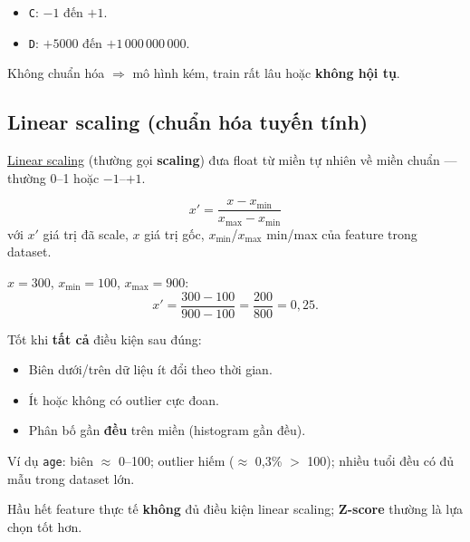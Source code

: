 \documentclass[12pt,a4paper]{article}
\begin{document}
\begin{vidu}[title={Feature miền chênh cực lớn}]
\begin{itemize}
  \item \texttt{C}: $-1$ đến $+1$.
  \item \texttt{D}: $+5000$ đến $+1\,000\,000\,000$.
\end{itemize}
Không chuẩn hóa $\Rightarrow$ mô hình kém, train rất lâu hoặc \textbf{không hội tụ}.
\end{vidu}

\subsection{Linear scaling (chuẩn hóa tuyến tính)}

\begin{dinhnghia}
\href{https://developers.google.com/machine-learning/glossary\#scaling}{Linear scaling} (thường gọi \textbf{scaling}) đưa float từ miền tự nhiên về miền chuẩn --- thường 0--1 hoặc $-1$--$+1$.
\end{dinhnghia}

\begin{congthuc}[title={Công thức scale về 0--1}]
\[
  x' = \frac{x - x_{\min}}{x_{\max} - x_{\min}}
\]
với $x'$ giá trị đã scale, $x$ giá trị gốc, $x_{\min}$/$x_{\max}$ min/max của feature trong dataset.
\end{congthuc}

\begin{vidu}[title={Feature \texttt{quantity}, miền 100--900, giá trị 300}]
$x=300$, $x_{\min}=100$, $x_{\max}=900$:
\[
  x' = \frac{300-100}{900-100} = \frac{200}{800} = 0{,}25.
\]
\end{vidu}

\begin{tinhchat}[title={Khi nào dùng linear scaling?}]
Tốt khi \textbf{tất cả} điều kiện sau đúng:
\begin{itemize}
  \item Biên dưới/trên dữ liệu ít đổi theo thời gian.
  \item Ít hoặc không có outlier cực đoan.
  \item Phân bố gần \textbf{đều} trên miền (histogram gần đều).
\end{itemize}
Ví dụ \texttt{age}: biên $\approx$ 0--100; outlier hiếm ($\approx$ 0{,}3\% $>$ 100); nhiều tuổi đều có đủ mẫu trong dataset lớn.
\end{tinhchat}

\begin{luuy}
Hầu hết feature thực tế \textbf{không} đủ điều kiện linear scaling; \textbf{Z-score} thường là lựa chọn tốt hơn.
\end{luuy}
\end{document}
